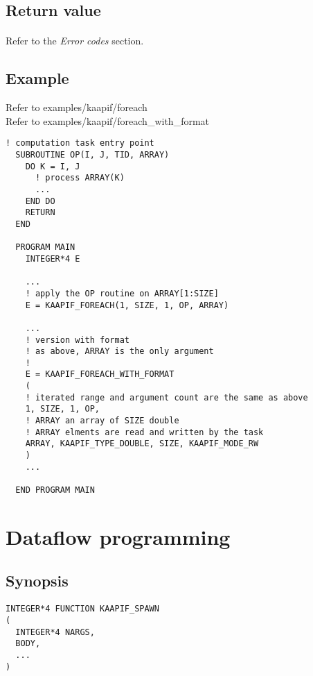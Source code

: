\documentclass[a4paper, 11pt]{article}
\begin{document}
\subsection{Return value}
\paragraph{}
Refer to the \textit{Error codes} section.

\subsection{Example}
Refer to examples/kaapif/foreach\\
Refer to examples/kaapif/foreach\_with\_format\\

\begin{small}
\begin{lstlisting}[frame=tb]
  ! computation task entry point
  SUBROUTINE OP(I, J, TID, ARRAY)
    DO K = I, J
      ! process ARRAY(K)
      ...
    END DO
    RETURN
  END

  PROGRAM MAIN
    INTEGER*4 E

    ...
    ! apply the OP routine on ARRAY[1:SIZE]
    E = KAAPIF_FOREACH(1, SIZE, 1, OP, ARRAY)

    ...
    ! version with format
    ! as above, ARRAY is the only argument
    ! 
    E = KAAPIF_FOREACH_WITH_FORMAT
    (
    ! iterated range and argument count are the same as above
    1, SIZE, 1, OP,
    ! ARRAY an array of SIZE double
    ! ARRAY elments are read and written by the task
    ARRAY, KAAPIF_TYPE_DOUBLE, SIZE, KAAPIF_MODE_RW
    )
    ...

  END PROGRAM MAIN
\end{lstlisting}
\end{small}

\newpage
\section{Dataflow programming}
\subsection{Synopsis}
\begin{small}
\lstset{language=C}
\begin{lstlisting}[frame=tb]
INTEGER*4 FUNCTION KAAPIF_SPAWN
(
  INTEGER*4 NARGS,
  BODY,
  ...
)
\end{lstlisting}
\end{small}
\end{document}

